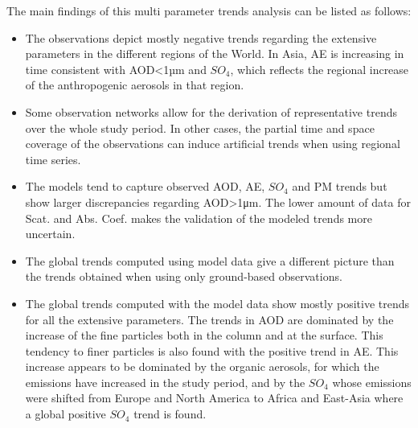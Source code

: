 \documentclass[journal abbreviation, manuscript]{copernicus}
\begin{document}
The main findings of this multi parameter trends analysis can be listed as follows:
\begin{itemize}
 \item The observations depict mostly negative trends regarding the extensive parameters in the different regions of the World. In Asia, AE is increasing in time consistent with AOD<1µm and $SO_{4}$, which reflects the regional increase of the anthropogenic aerosols in that region.
 \item Some observation networks allow for the derivation of representative trends over the whole study period. In other cases, the partial time and space coverage of the observations can induce artificial trends when using regional time series.
 \item The models tend to capture observed AOD, AE, $SO_{4}$ and PM trends but show larger discrepancies regarding AOD>1μm. The lower amount of data for Scat. and Abs. Coef. makes the validation of the modeled trends more uncertain.
 \item The global trends computed using model data give a different picture than the trends obtained when using only ground-based observations.
 \item The global trends computed with the model data show mostly positive trends for all the extensive parameters. The trends in AOD are dominated by the increase of the fine particles both in the column and at the surface. This tendency to finer particles is also found with the positive trend in AE. This increase appears to be dominated by the organic aerosols, for which the emissions have increased in the study period, and by the $SO_{4}$ whose emissions were shifted from Europe and North America to Africa and East-Asia where a global positive $SO_{4}$ trend is found.
\end{itemize}
\end{document}
